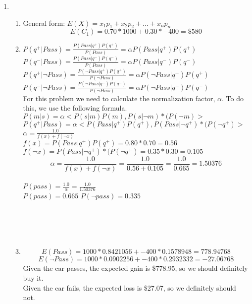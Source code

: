 \documentclass[12pt,a4paper]{report}
\begin{document}
\begin{enumerate}
\pagebreak
\item
\begin{enumerate}
	\item
	General form: $E(X) = x_1p_1 + x_2p_2 + ... + x_np_n$\\
	\[E(C_{1}) = 0.70*1000 + 0.30*-400 = \$580\]
	
	\item
	$P(q^{+}|Pass) = \frac{P(Pass|q^{+})P(q^{+})}{P(Pass)} = \alpha P(Pass|q^{+})P(q^{+})$\\
	$P(q^{-}|Pass) = \frac{P(Pass|q^{-})P(q^{-})}{P(Pass)} = \alpha P(Pass|q^{-})P(q^{-})$\\
	$P(q^{+}|\neg Pass) = \frac{P(\neg Pass|q^{+})P(q^{+})}{P(\neg Pass)} = \alpha P(\neg Pass|q^{+})P(q^{+})$\\
	$P(q^{-}|\neg Pass) = \frac{P(\neg Pass|q^{-})P(q^{-})}{P(\neg Pass)} = \alpha P(\neg Pass|q^{-})P(q^{-})$\\
	For this problem we need to calculate the normalization factor, $\alpha$. To do this, we use the following formula.\\
	$P(m|s)=\alpha <P(s|m)P(m),P(s|\neg m)*(P(\neg m)>$\\
	$P(q^{+}|Pass)=\alpha <P(Pass|q^{+})P(q^{+}),P(Pass|\neg q^{+})*(P(\neg q^{+})>$\\
	$\alpha = \frac{1.0}{f(x)+f(\neg x)}$\\
	$f(x) = P(Pass|q^{+})P(q^{+}) = 0.80*0.70 = 0.56$\\
	$f(\neg x) = P(Pass|\neg q^{+})*(P(\neg q^{+}) = 0.35 * 0.30 = 0.105$\\
	\[\alpha = \frac{1.0}{f(x)+f(\neg x)} = \frac{1.0}{0.56+0.105} = \frac{1.0}{0.665} = 1.50376\]\\
	$P(pass) = \frac{1.0}{\alpha} = \frac{1.0}{1.50376}$\\
	$P(pass) = 0.665$ $P(\neg pass) = 0.335$\\
	\\
	\\
	\\
	\\
	
	\item
	\[E(Pass) = 1000*0.8421056 + -400*0.1578948 = 778.94768\]
	\[E(\neg Pass) = 1000*0.0902256 + -400*0.2932332 = -27.06768\]
	Given the car passes, the expected gain is \$778.95, so we should definitely buy it.\\
	Given the car fails, the expected loss is \$27.07, so we definitely should not.\\
	

\end{enumerate}
\end{enumerate}
\end{document}
